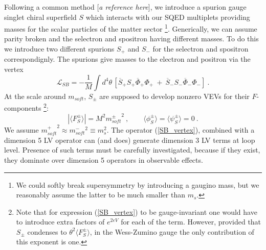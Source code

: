 \documentclass[a4paper,12pt]{article}
\begin{document}
	Following a common method [{\it a reference here}],
	we introduce a spurion gauge singlet
	chiral superfield $ S $ which interacts with our SQED
	multiplets providing masses for the scalar particles
	of the matter sector
\footnote{
	We could softly break supersymmetry by
	introducing a gaugino mass, but we reasonably assume
	the latter to be much smaller than $ m_s $. 
	}.
	Generically, we can assume parity broken and 
	the selectron and spositron having different masses.
	To do this we introduce two different
	spurions $ S_+ $ and $ S_- $
	for the selectron and spositron correspondignly.
	The spurions give masses to the electron and positron
	via the vertex
\begin{equation}
\label{SB_vertex}
  \mathcal{L}_{SB} = - \frac{1}{M} \int d^4\theta \, 
	\left[	\overline{S}_+ S_+ \overline{\Phi}_+ \Phi_+ 
		~+~
		\overline{S}_- S_- \overline{\Phi}_- \Phi_-
	\right] 
	~.
\end{equation}
	At the scale around $ m_{soft} $, $ S_\pm $ are supposed to develop
	nonzero VEVs for their $ F $-components
\footnote{
	Note that for expression (\ref{SB_vertex}) to be 
	gauge-invariant one would have to introduce extra factors
	of $ e^{2eV} $ for each of the term. 
	However, provided that $ S_\pm $ condenses to 
	$ \theta^2 \langle F^\pm_S \rangle $,
	in the Wess-Zumino gauge the only contribution of this
	exponent is one.
	}:
\[
	\left | \langle F^\pm_S \rangle \right | =
		M^2 {m^\pm_{soft}}^2~,\qquad 
		\langle\phi_S^\pm\rangle = 
		\langle\psi_S^\pm\rangle = 0~.
\]
	We assume 
	$ {m_{soft}^+}^2 \approx {m_{soft}^-}^2 \equiv m_s^2 $.
	The operator (\ref{SB_vertex}), 
	combined with a dimension 5 LV operator
	can (and does) generate dimension 3 LV terms at loop level. 
	Presence of such terms must be carefully investigated, 
	because if they exist, they dominate over dimension 5 operators
	in observable effects.
\end{document}
